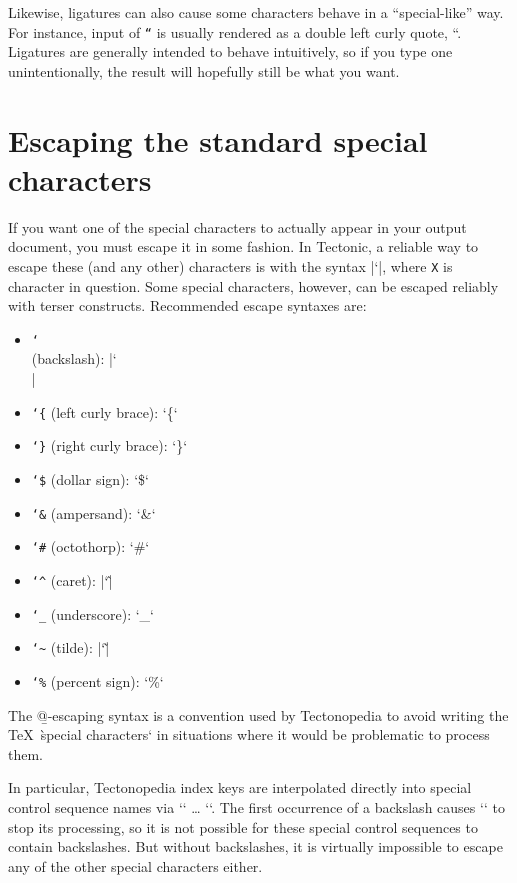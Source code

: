 Likewise, ligatures can also cause some characters behave in a “special-like”
way. For instance, input of \texttt{``} is usually rendered as a
double left curly quote, “. Ligatures are generally intended to behave
intuitively, so if you type one unintentionally, the result will hopefully still
be what you want.

\section*{Escaping the standard special characters}

If you want one of the special characters to actually appear in your output
document, you must escape it in some fashion. In Tectonic, a reliable way to
escape these (and any other) characters is with the syntax \tex|\char`\X|, where
\texttt{X} is character in question. Some special characters, however, can be
escaped reliably with terser constructs. Recommended escape syntaxes are:
\begin{itemize}
    \item \b{\texttt{\char`\\} (backslash)}: \tex|\char`\\|
    \item \b{\texttt{\char`\{} (left curly brace)}: \tex`\{`
    \item \b{\texttt{\char`\}} (right curly brace)}: \tex`\}`
    \item \b{\texttt{\char`\$} (dollar sign)}: \tex`\$`
    \item \b{\texttt{\char`\&} (ampersand)}: \tex`\&`
    \item \b{\texttt{\char`\#} (octothorp)}: \tex`\#`
    \item \b{\texttt{\char`\^} (caret)}: \tex|\char`\^|
    \item \b{\texttt{\char`\_} (underscore)}: \tex`\_`
    \item \b{\texttt{\char`\~} (tilde)}: \tex|\char`\~|
    \item \b{\texttt{\char`\%} (percent sign)}: \tex`\%`
\end{itemize}



The \b{@-escaping} syntax is a convention used by Tectonopedia to avoid writing
the \TeX\ \`special characters` in situations where it would be problematic to
process them.

In particular, Tectonopedia index keys are interpolated directly into special
control sequence names via \tex`\csname` … \tex`\endcsname`. The first
occurrence of a backslash causes \tex`\csname` to stop its processing, so it is
not possible for these special control sequences to contain backslashes. But
without backslashes, it is virtually impossible to escape any of the other
special characters either.

